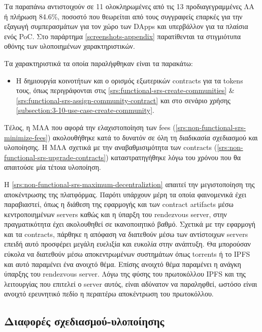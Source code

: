 Τα παραπάνω αντιστοιχούν σε 11 ολοκληρωμένες από τις 13 προδιαγεγραμμένες ΛΑ ή πλήρωση 84.6\%, ποσοστό που θεωρείται από τους συγγραφείς επαρκές για την εξαγωγή συμπερασμάτων για τον χώρο των DApps και υπερβάλλον για τα πλαίσια ενός PoC. Στο παράρτημα \ref{screenshots-appendix} παρατίθενται τα στιγμιότυπα οθόνης των υλοποιημένων χαρακτηριστικών.

Τα χαρακτηριστικά τα οποία παραλήφθηκαν είναι τα παρακάτω:

\begin{itemize}
    \item Η δημιουργία κοινοτήτων και ο ορισμός εξωτερικών contracts για τα tokens τους, όπως περιγράφονται στις \ref{srs:functional-srs-create-communities} \& \ref{srs:functional-srs-assign-community-contract} και στο σενάριο χρήσης \ref{subsection:3-10-use-case-create-community}.
\end{itemize}

Τέλος, η ΜΛΑ που αφορά την ελαχιστοποίηση των fees (\ref{srs:non-functional-srs-minimize-fees}) ακολουθήθηκε κατά το δυνατόν σε όλη τη διαδικασία σχεδιασμού και υλοποίησης. Η ΜΛΑ σχετικά με την αναβαθμισιμότητα των contracts (\ref{srs:non-functional-srs-upgrade-contracts}) καταστρατηγήθηκε λόγω του χρόνου που θα απαιτούσε μία τέτοια υλοποίηση.

Η \ref{srs:non-functional-srs-maximum-decentraliztion} απαιτεί την μεγιστοποίηση της αποκέντρωσης της πλατφόρμας. Παρότι υπάρχουν μέρη τα οποία φαινομενικά έχει παραβιαστεί, όπως η διάθεση της εφαρμογής και των contract artifacts μέσω κεντροποιημένων servers καθώς και η ύπαρξη του rendezvous server, στην πραγματικότητα έχει ακολουθηθεί σε ικανοποιητικό βαθμό. Σχετικά με την εφαρμογή και τα contracts, πάρθηκε η απόφαση να διατεθούν μέσω των αντίστοιχων servers επειδή αυτό προσφέρει μεγάλη ευελιξία και ευκολία στην ανάπτυξη. Θα μπορούσαν εύκολα να διατεθούν μέσω αποκεντρωμένων συστημάτων όπως torrents ή το IPFS και αυτό παραμένει ένα ανοιχτό θέμα. Επίσης ανοιχτό θέμα παραμένει η ανάγκη ύπαρξης του rendezvous server. Λόγω της φύσης του πρωτοκόλλου IPFS και της λειτουργίας που επιτελεί ο server αυτός, είναι αδύνατον να παραληφθεί, ωστόσο είναι ανοιχτό ερευνητικό πεδίο η περαιτέρω αποκέντρωση του πρωτοκόλλου.

\subsection{Διαφορές σχεδιασμού-υλοποίησης} \label{subsection:4-6-1-design-implementation-differences}

